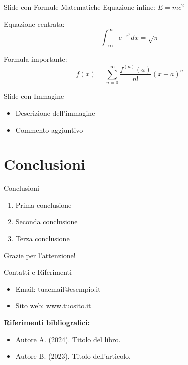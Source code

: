 \documentclass[aspectratio=169]{beamer}
\begin{document}
\begin{frame}{Slide con Formule Matematiche}
Equazione inline: $E = mc^2$

Equazione centrata:
\begin{equation}
\int_{-\infty}^{\infty} e^{-x^2} dx = \sqrt{\pi}
\end{equation}

Formula importante:
\[
f(x) = \sum_{n=0}^{\infty} \frac{f^{(n)}(a)}{n!}(x-a)^n
\]
\end{frame}

\begin{frame}{Slide con Immagine}
\begin{center}
\end{center}
\begin{itemize}
    \item Descrizione dell'immagine
    \item Commento aggiuntivo
\end{itemize}
\end{frame}

\section{Conclusioni}

\begin{frame}{Conclusioni}
\begin{enumerate}
    \item Prima conclusione
    \item Seconda conclusione
    \item Terza conclusione
\end{enumerate}

\vspace{1cm}
\centering
\Large Grazie per l'attenzione!
\end{frame}

\begin{frame}{Contatti e Riferimenti}
\begin{itemize}
    \item Email: tuaemail@esempio.it
    \item Sito web: www.tuosito.it
\end{itemize}

\vspace{1cm}
\textbf{Riferimenti bibliografici:}
\begin{itemize}
    \item Autore A. (2024). Titolo del libro.
    \item Autore B. (2023). Titolo dell'articolo.
\end{itemize}
\end{frame}
\end{document}

